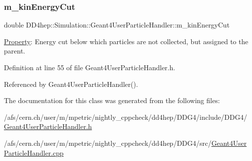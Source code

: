 \subsubsection{\texorpdfstring{m\+\_\+kin\+Energy\+Cut}{m\_kinEnergyCut}}
{\footnotesize\ttfamily double D\+D4hep\+::\+Simulation\+::\+Geant4\+User\+Particle\+Handler\+::m\+\_\+kin\+Energy\+Cut\hspace{0.3cm}{\ttfamily [protected]}}



\hyperlink{class_d_d4hep_1_1_property}{Property}\+: Energy cut below which particles are not collected, but assigned to the parent. 



Definition at line 55 of file Geant4\+User\+Particle\+Handler.\+h.



Referenced by Geant4\+User\+Particle\+Handler().



The documentation for this class was generated from the following files\+:\begin{DoxyCompactItemize}
\item 
/afs/cern.\+ch/user/m/mpetric/nightly\+\_\+cppcheck/dd4hep/\+D\+D\+G4/include/\+D\+D\+G4/\hyperlink{_geant4_user_particle_handler_8h}{Geant4\+User\+Particle\+Handler.\+h}\item 
/afs/cern.\+ch/user/m/mpetric/nightly\+\_\+cppcheck/dd4hep/\+D\+D\+G4/src/\hyperlink{_geant4_user_particle_handler_8cpp}{Geant4\+User\+Particle\+Handler.\+cpp}\end{DoxyCompactItemize}
